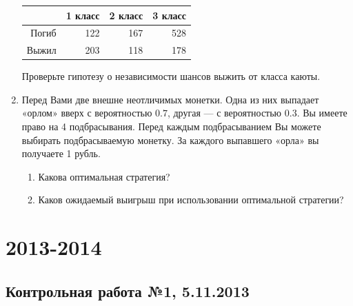 \documentclass[12pt, a4paper]{article}\usepackage[]{graphicx}\usepackage[]{color}
\begin{document}
\begin{enumerate}
\begin{table}[ht]
\centering
\begin{tabular}{rrrr}
  \hline
 & 1 класс & 2 класс & 3 класс \\
  \hline
Погиб & 122 & 167 & 528 \\
  Выжил & 203 & 118 & 178 \\
   \hline
\end{tabular}
\end{table}


Проверьте гипотезу о независимости шансов выжить от класса каюты.

\item Перед Вами две внешне неотличимых монетки. Одна из них выпадает «орлом» вверх с вероятностью $0.7$, другая — с вероятностью $0.3$. Вы имеете право на 4 подбрасывания. Перед каждым подбрасыванием Вы можете выбирать подбрасываемую монетку. За каждого выпавшего «орла» вы получаете 1 рубль.
\begin{enumerate}
\item Какова оптимальная стратегия?
\item Каков ожидаемый выигрыш при использовании оптимальной стратегии?
\end{enumerate}

\end{enumerate}


\section{2013-2014}

\subsection{Контрольная работа №1, 5.11.2013}
\end{document}
